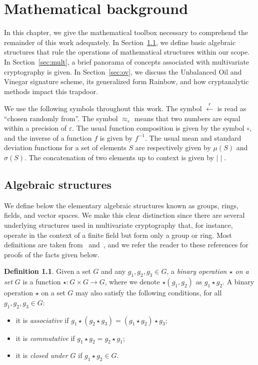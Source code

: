 \documentclass[english]{ufsc-thesis-rn46-2019/ufsc-thesis-rn46-2019}
\newcommand{\random}{\overset{\mathsf{r}}{\gets}}
\theoremstyle{definition}
\newtheorem{definition}[theorem]{Definition}
\begin{document}
\chapter{Mathematical background}\label{ch:math}

In this chapter, we give the mathematical toolbox necessary to comprehend the
remainder of this work adequately. In Section~\ref{sec:algebra}, we define
basic algebraic structures that rule the operations of mathematical structures
within our scope. In Section~\ref{sec:mult}, a brief panorama of concepts
associated with multivariate cryptography is given. In Section~\ref{sec:ov}, we
discuss the Unbalanced Oil and Vinegar signature scheme, its generalized form
Rainbow, and how cryptanalytic methods impact this trapdoor.

We use the following symbols throughout this work. The symbol $\random$ is read
as ``chosen randomly from''. The symbol $\approx_{\varepsilon}$ means that two
numbers are equal within a precision of $\varepsilon$. The usual function
composition is given by the symbol $\circ$, and the inverse of a function $f$
is given by $f^{-1}$. The usual mean and standard deviation functions for a set
of elements $S$ are respectively given by $\mu(S)$ and $\sigma(S)$. The
concatenation of two elements up to context is given by $\mid\mid$.

\section{Algebraic structures}\label{sec:algebra}

We define below the elementary algebraic structures known as groups, rings,
fields, and vector spaces. We make this clear distinction since there are
several underlying structures used in multivariate cryptography that, for
instance, operate in the context of a finite field but form only a group or
ring. Most definitions are taken from~\cite{Dummit:2003}
and~\cite{Mullen:2013}, and we refer the reader to these references for proofs
of the facts given below.

\begin{definition}
  Given a set $G$ and any $g_{1}, g_{2}, g_{3} \in G$, a \emph{binary operation
  $\star$ on a set $G$} is a function $\star : G \times G \to G$, where we
  denote $\star(g_{1}, g_{2})$ as $g_{1} \star g_{2}$. A binary operation
  $\star$ on a set $G$ may also satisfy the following conditions, for all
  $g_{1}, g_{2}, g_{3} \in G$:

  \begin{itemize}
    \item it is \emph{associative} if
      $g_{1} \star (g_{2} \star g_{3}) = (g_{1} \star g_{2}) \star g_{3}$;
    \item it is \emph{commutative} if $g_{1} \star g_{2} = g_{2} \star g_{1}$;
    \item it is \emph{closed under $G$} if $g_{1} \star g_{2} \in G$.
  \end{itemize}
\end{definition}
\end{document}
